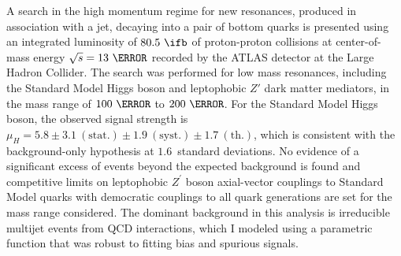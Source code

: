 A search in the high momentum regime for new resonances, produced in association with a jet, decaying into a pair of bottom quarks is presented using an integrated luminosity of $80.5~\ifb$ of proton-proton collisions at center-of-mass energy $\sqrt{s}=13~\TeV$ recorded by the ATLAS detector at the Large Hadron Collider.
The search was performed for low mass resonances, including the Standard Model Higgs boson and leptophobic $Z'$ dark matter mediators, in the mass range of $100~\GeV$ to $200~\GeV$.
For the Standard Model Higgs boson, the observed signal strength is $\mu_{H} = 5.8 \pm 3.1~\mathrm{(stat.)} \pm 1.9~\mathrm{(syst.)} \pm 1.7~\mathrm{(th.)}$, which is consistent with the background-only hypothesis at $1.6$~standard deviations.
No evidence of a significant excess of events beyond the expected background is found and competitive limits on leptophobic $Z^\prime$ boson axial-vector couplings to Standard Model quarks with democratic couplings to all quark generations are set for the mass range considered.
The dominant background in this analysis is irreducible multijet events from QCD interactions, which I modeled using a parametric function that was robust to fitting bias and spurious signals.
